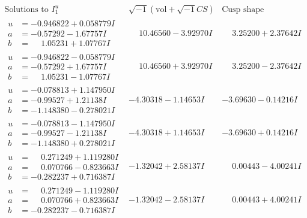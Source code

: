 \documentclass[1p]{elsarticle_modified}
\theoremstyle{definition}
\newcommand{\I}{\sqrt{-1}}
\begin{document}
$$\begin{array}{c|c|c}  
\text{Solutions to }I^u_{1}& \I (\text{vol} + \sqrt{-1}CS) & \text{Cusp shape}\\
 \hline 
\begin{aligned}
u &= -0.946822 + 0.058779 I \\
a &= -0.57292 - 1.67757 I \\
b &= \phantom{-}1.05231 + 1.07767 I\end{aligned}
 & \phantom{-}10.46560 - 3.92970 I & \phantom{-}3.25200 + 2.37642 I \\ \hline\begin{aligned}
u &= -0.946822 - 0.058779 I \\
a &= -0.57292 + 1.67757 I \\
b &= \phantom{-}1.05231 - 1.07767 I\end{aligned}
 & \phantom{-}10.46560 + 3.92970 I & \phantom{-}3.25200 - 2.37642 I \\ \hline\begin{aligned}
u &= -0.078813 + 1.147950 I \\
a &= -0.99527 + 1.21138 I \\
b &= -1.148380 - 0.278021 I\end{aligned}
 & -4.30318 - 1.14653 I & -3.69630 - 0.14216 I \\ \hline\begin{aligned}
u &= -0.078813 - 1.147950 I \\
a &= -0.99527 - 1.21138 I \\
b &= -1.148380 + 0.278021 I\end{aligned}
 & -4.30318 + 1.14653 I & -3.69630 + 0.14216 I \\ \hline\begin{aligned}
u &= \phantom{-}0.271249 + 1.119280 I \\
a &= \phantom{-}0.070766 - 0.823663 I \\
b &= -0.282237 + 0.716387 I\end{aligned}
 & -1.32042 + 2.58137 I & \phantom{-}0.00443 - 4.00241 I \\ \hline\begin{aligned}
u &= \phantom{-}0.271249 - 1.119280 I \\
a &= \phantom{-}0.070766 + 0.823663 I \\
b &= -0.282237 - 0.716387 I\end{aligned}
 & -1.32042 - 2.58137 I & \phantom{-}0.00443 + 4.00241 I \\ \hline\begin{aligned}

\end{aligned}
\end{array}$$
\end{document}
